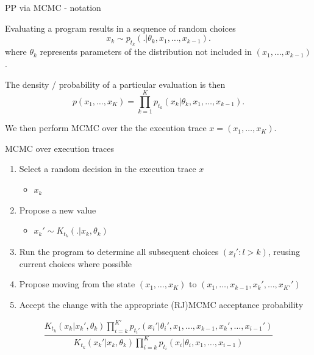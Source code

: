 \begin{frame}{PP via MCMC - notation}
  \begin{block}{}
    Evaluating a program results in a sequence of random choices
    \begin{equation*}
      x_k \sim p_{t_k}(.|\theta_{k},x_1,\ldots,x_{k-1}).
    \end{equation*}
    where $\theta_{k}$ represents parameters of the distribution not included in $(x_1,\ldots,x_{k-1})$.
    \newline
    
    The density / probability of a particular evaluation is then
    \begin{equation*}
      p(x_1,\ldots,x_K) = \prod_{k=1}^K p_{t_k}(x_k|\theta_{k},x_1,\ldots,x_{k-1}).
    \end{equation*}
    
    We then perform MCMC over the the execution trace $x = (x_1,\ldots,x_K)$.
    
  \end{block}
\end{frame}

\begin{frame}{MCMC over execution traces}
  \begin{enumerate}
    \item Select a random decision in the execution trace $x$
    \begin{itemize}
      \item{\eg $x_k$}
    \end{itemize}
    \vspace{\baselineskip}
    \item Propose a new value
    \begin{itemize}
      \item{\eg $x_k' \sim K_{t_k}(.|x_k,\theta_k)$}
    \end{itemize}
    \vspace{\baselineskip}
    \item Run the program to determine all subsequent choices $(x_l' : l > k)$, reusing current choices where possible
    \vspace{\baselineskip}
    \item Propose moving from the state $(x_1,\ldots,x_K)$ to $(x_1,\ldots,x_{k-1},x_k',\ldots,x_{K'}')$
    \vspace{\baselineskip}
    \item Accept the change with the appropriate (RJ)MCMC acceptance probability
  \end{enumerate}
  \begin{equation*}
    \frac{K_{t_k}(x_k|x_k',\theta_k)\prod_{i=k}^{K'} p_{t_i'}(x_i'|\theta_{i}',x_1,\ldots,x_{k-1},x_k',\ldots,x_{i-1}')}{K_{t_k}(x_k'|x_k,\theta_k)\prod_{i=k}^K p_{t_i}(x_i|\theta_{i},x_1,\ldots,x_{i-1})}
  \end{equation*}
\end{frame}

